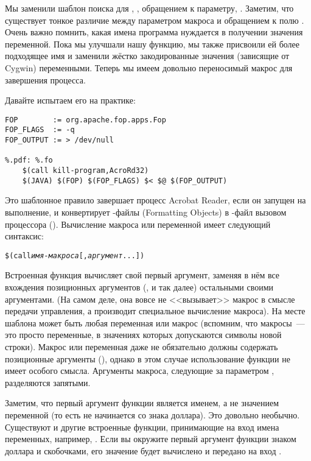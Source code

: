 Мы заменили шаблон поиска для , ,
обращением к параметру, . Заметим, что существует
тонкое различие между параметром макроса  и обращением
к полю  .  Очень важно помнить, какая
имена программа нуждается в получении значения переменной. Пока мы
улучшали нашу функцию, мы также присвоили ей более подходящее имя и
заменили жёстко закодированные значения (зависящие от Cygwin)
переменными. Теперь мы имеем довольно переносимый макрос для
завершения процесса.

Давайте испытаем его на практике:

{\footnotesize
\begin{verbatim}
FOP        := org.apache.fop.apps.Fop
FOP_FLAGS  := -q
FOP_OUTPUT := > /dev/null

%.pdf: %.fo
    $(call kill-program,AcroRd32)
    $(JAVA) $(FOP) $(FOP_FLAGS) $< $@ $(FOP_OUTPUT)
\end{verbatim}
}

Это шаблонное правило завершает процесс Acrobat Reader, если он
запущен на выполнение, и конвертирует -файлы (Formatting
Objects) в -файл вызовом процессора 
(). Вычисление макроса или
переменной имеет следующий синтаксис:

{\footnotesize
\begin{alltt}
\$(call \emph{имя-макроса}[, \emph{аргумент} . . . ])
\end{alltt}
}

Встроенная функция  вычисляет свой первый аргумент,
заменяя в нём все вхождения позиционных аргументов (,
 и так далее) остальными своими аргументами.  (На
самом деле, она вовсе не <<вызывает>> макрос в смысле передачи
управления, а производит специальное вычисление макроса).  На месте
шаблона  может быть любая переменная или
макрос (вспомним, что макросы~--- это просто переменные, в значениях
которых допускаются символы новой строки). Макрос или переменная даже
не обязательно должны содержать позиционные аргументы
(), однако в этом случае использование функции
 не имеет особого смысла. Аргументы макроса, следующие
за параметром , разделяются запятыми.

Заметим, что первый аргумент функции  является именем,
а не значением переменной (то есть не начинается со знака доллара).
Это довольно необычно. Существуют и другие встроенные функции,
принимающие на вход имена переменных, например, .
Если вы окружите первый аргумент функции  знаком
доллара и скобочками, его значение будет вычислено и передано на вход
.

